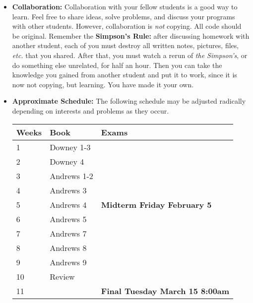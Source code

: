 \documentclass{article}
\begin{document}
\begin{itemize}
\item {\bf Collaboration:} Collaboration with your fellow students is
  a good way to learn.  Feel free to share ideas, solve problems, and
  discuss your programs with other students.  However, collaboration
  is {\em not} copying.  All code should be original.  Remember the
  {\bf Simpson's Rule:} after discussing homework with another
  student, each of you must destroy all written notes, pictures,
  files, {\em etc.} that you shared.  After that, you must watch a
  rerun of {\em the Simpson's}, or do something else unrelated, for
  half an hour.  Then you can take the knowledge you gained from
  another student and put it to work, since it is now not copying, but
  learning.  You have made it your own.

\item
{\bf Approximate Schedule:} The following schedule may be adjusted
radically depending on interests and problems as they occur.

\begin{tabular}{|l|l|l|}\hline
Weeks & Book & Exams \\\hline
1 & Downey  1-3 & \\
2 & Downey  4  & \\
3 & Andrews 1-2  & \\
4 & Andrews 3 & \\\hline
5 & Andrews 4 & { \bf Midterm Friday February 5} \\\hline
6 & Andrews 5 & \\
7 & Andrews 7 & \\
8 & Andrews 8 & \\
9 & Andrews 9 & \\
10 & Review  & \\\hline
11&& {\bf Final Tuesday March 15 8:00am}\\\hline
\end{tabular}
\end{itemize}
\end{document}
